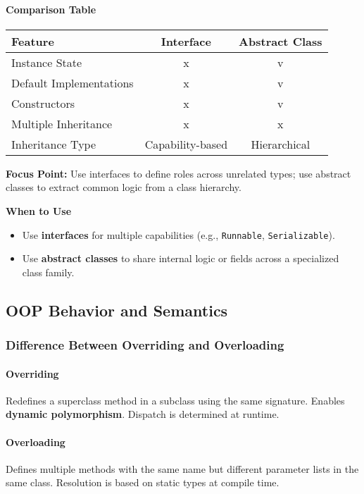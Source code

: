 \documentclass[a4paper,12pt]{article}
\begin{document}
\paragraph{Comparison Table}

\begin{center}
\begin{tabular}{|l|c|c|}
\hline
\textbf{Feature} & \textbf{Interface} & \textbf{Abstract Class} \\
\hline
Instance State           & x & v \\
Default Implementations  & x & v \\
Constructors             & x & v \\
Multiple Inheritance     & x & x \\
Inheritance Type         & Capability-based & Hierarchical \\
\hline
\end{tabular}
\end{center}

\textbf{Focus Point:} Use interfaces to define roles across unrelated types; use abstract classes to extract common logic from a class hierarchy.

\textbf{When to Use}
\begin{itemize}
  \item Use \textbf{interfaces} for multiple capabilities (e.g., \texttt{Runnable}, \texttt{Serializable}).
  \item Use \textbf{abstract classes} to share internal logic or fields across a specialized class family.
\end{itemize}

\subsection{OOP Behavior and Semantics}

\subsubsection{Difference Between Overriding and Overloading}

\paragraph{Overriding}
Redefines a superclass method in a subclass using the same signature. Enables \textbf{dynamic polymorphism}. Dispatch is determined at runtime.

\paragraph{Overloading}
Defines multiple methods with the same name but different parameter lists in the same class. Resolution is based on static types at compile time.
\end{document}
